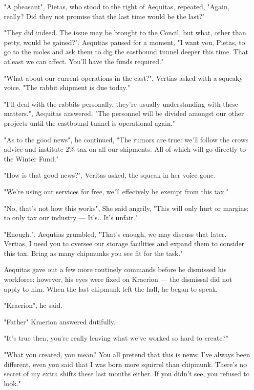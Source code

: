 \documentclass[smalldemyvopaper,11pt,twoside,onecolumn,openright,extrafontsizes]{memoir}
\begin{document}
"A pheasant", Pietas, who stood to the right of Aequitas, repeated, "Again, really? Did they not promise that the last time would be the last?"  

"They did indeed. The issue may be brought to the Concil, but what, other than petty, would be gained?", Aequtias paused for a moment, "I want you, Pietas, to go to the moles and ask them to dig the eastbound tunnel deeper this time. That atleast we can affect. You'll have the funds required."

"What about our current operations in the east?", Vertias asked with a squeaky voice. "The rabbit shipment is due today." 

"I'll deal with the rabbits personally, they're usually understanding with these matters.", Aequitas answered, "The personnel will be divided amongst our other projects until the eastbound tunnel is operational again."

"As to the good news", he continued, "The rumors are true: we'll follow the crows advice and institute 2\% tax on all our shipments. All of which will go directly to the Winter Fund."

"How is that good news?", Veritas asked, the squeak in her voice gone.

"We're using our services for free, we'll effecively be exempt from this tax."

"No, that's not how this works", She said angrily, "This will only hurt or margins; to only tax our industry — It's.. It's unfair."

"Enough.", Aequtias grumbled, "That's enough, we may discuss that later. Vertias, I need you to oversee our storage facilities and expand them to consider this tax. Bring as many chipmunks you see fit for the task." 

Aequitas gave out a few more routinely commands before he dismissed his workforce; however, his eyes were fixed on Kraerion — the dismissal did not apply to him. When the last chipmunk left the hall, he began to speak.

"Kraerion", he said.

"Father" Kraerion answered dutifully.

"It's true then, you're really leaving what we've worked so hard to create?"

"What you created, you mean? You all pretend that this is news; I've always been different, even you said that I was born more squirrel than chipmunk. There's no secret of my extra shifts these last months either. If you didn't see, you refused to look."
\end{document}
